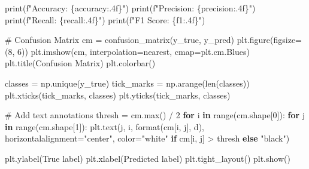 \documentclass[
  letterpaper,
  DIV=11,
  numbers=noendperiod]{scrreprt}
\newenvironment{Shaded}{\begin{snugshade}}{\end{snugshade}}
\newcommand{\BuiltInTok}[1]{\textcolor[rgb]{0.00,0.23,0.31}{#1}}
\newcommand{\CommentTok}[1]{\textcolor[rgb]{0.37,0.37,0.37}{#1}}
\newcommand{\ControlFlowTok}[1]{\textcolor[rgb]{0.00,0.23,0.31}{\textbf{#1}}}
\newcommand{\DecValTok}[1]{\textcolor[rgb]{0.68,0.00,0.00}{#1}}
\newcommand{\KeywordTok}[1]{\textcolor[rgb]{0.00,0.23,0.31}{\textbf{#1}}}
\newcommand{\NormalTok}[1]{\textcolor[rgb]{0.00,0.23,0.31}{#1}}
\newcommand{\OperatorTok}[1]{\textcolor[rgb]{0.37,0.37,0.37}{#1}}
\newcommand{\SpecialCharTok}[1]{\textcolor[rgb]{0.37,0.37,0.37}{#1}}
\newcommand{\SpecialStringTok}[1]{\textcolor[rgb]{0.13,0.47,0.30}{#1}}
\newcommand{\StringTok}[1]{\textcolor[rgb]{0.13,0.47,0.30}{#1}}
\begin{document}
\begin{Shaded}
\begin{Highlighting}[]
    \BuiltInTok{print}\NormalTok{(}\SpecialStringTok{f"Accuracy: }\SpecialCharTok{\{}\NormalTok{accuracy}\SpecialCharTok{:.4f\}}\SpecialStringTok{"}\NormalTok{)}
    \BuiltInTok{print}\NormalTok{(}\SpecialStringTok{f"Precision: }\SpecialCharTok{\{}\NormalTok{precision}\SpecialCharTok{:.4f\}}\SpecialStringTok{"}\NormalTok{)}
    \BuiltInTok{print}\NormalTok{(}\SpecialStringTok{f"Recall: }\SpecialCharTok{\{}\NormalTok{recall}\SpecialCharTok{:.4f\}}\SpecialStringTok{"}\NormalTok{)}
    \BuiltInTok{print}\NormalTok{(}\SpecialStringTok{f"F1 Score: }\SpecialCharTok{\{}\NormalTok{f1}\SpecialCharTok{:.4f\}}\SpecialStringTok{"}\NormalTok{)}
    
    \CommentTok{\# Confusion Matrix}
\NormalTok{    cm }\OperatorTok{=}\NormalTok{ confusion\_matrix(y\_true, y\_pred)}
\NormalTok{    plt.figure(figsize}\OperatorTok{=}\NormalTok{(}\DecValTok{8}\NormalTok{, }\DecValTok{6}\NormalTok{))}
\NormalTok{    plt.imshow(cm, interpolation}\OperatorTok{=}\StringTok{\textquotesingle{}nearest\textquotesingle{}}\NormalTok{, cmap}\OperatorTok{=}\NormalTok{plt.cm.Blues)}
\NormalTok{    plt.title(}\StringTok{\textquotesingle{}Confusion Matrix\textquotesingle{}}\NormalTok{)}
\NormalTok{    plt.colorbar()}
    
\NormalTok{    classes }\OperatorTok{=}\NormalTok{ np.unique(y\_true)}
\NormalTok{    tick\_marks }\OperatorTok{=}\NormalTok{ np.arange(}\BuiltInTok{len}\NormalTok{(classes))}
\NormalTok{    plt.xticks(tick\_marks, classes)}
\NormalTok{    plt.yticks(tick\_marks, classes)}
    
    \CommentTok{\# Add text annotations}
\NormalTok{    thresh }\OperatorTok{=}\NormalTok{ cm.}\BuiltInTok{max}\NormalTok{() }\OperatorTok{/} \DecValTok{2}
    \ControlFlowTok{for}\NormalTok{ i }\KeywordTok{in} \BuiltInTok{range}\NormalTok{(cm.shape[}\DecValTok{0}\NormalTok{]):}
        \ControlFlowTok{for}\NormalTok{ j }\KeywordTok{in} \BuiltInTok{range}\NormalTok{(cm.shape[}\DecValTok{1}\NormalTok{]):}
\NormalTok{            plt.text(j, i, }\BuiltInTok{format}\NormalTok{(cm[i, j], }\StringTok{\textquotesingle{}d\textquotesingle{}}\NormalTok{),}
\NormalTok{                     horizontalalignment}\OperatorTok{=}\StringTok{"center"}\NormalTok{,}
\NormalTok{                     color}\OperatorTok{=}\StringTok{"white"} \ControlFlowTok{if}\NormalTok{ cm[i, j] }\OperatorTok{\textgreater{}}\NormalTok{ thresh }\ControlFlowTok{else} \StringTok{"black"}\NormalTok{)}
    
\NormalTok{    plt.ylabel(}\StringTok{\textquotesingle{}True label\textquotesingle{}}\NormalTok{)}
\NormalTok{    plt.xlabel(}\StringTok{\textquotesingle{}Predicted label\textquotesingle{}}\NormalTok{)}
\NormalTok{    plt.tight\_layout()}
\NormalTok{    plt.show()}
    

\end{Highlighting}
\end{Shaded}
\end{document}
